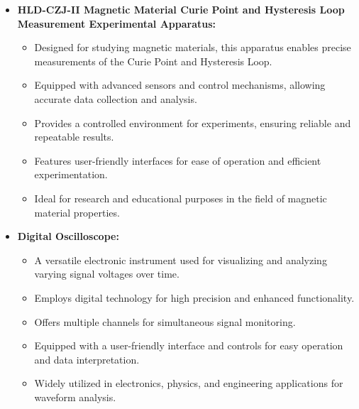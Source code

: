 \documentclass[UTF8]{article}
\begin{document}
    \begin{itemize}
        \item \textbf{HLD-CZJ-II Magnetic Material Curie Point and Hysteresis Loop Measurement Experimental Apparatus:}
            \begin{itemize}
                \item Designed for studying magnetic materials, this apparatus enables precise measurements of the Curie Point and Hysteresis Loop.
                \item Equipped with advanced sensors and control mechanisms, allowing accurate data collection and analysis.
                \item Provides a controlled environment for experiments, ensuring reliable and repeatable results.
                \item Features user-friendly interfaces for ease of operation and efficient experimentation.
                \item Ideal for research and educational purposes in the field of magnetic material properties.
            \end{itemize}
            
        \item \textbf{Digital Oscilloscope:}
            \begin{itemize}
                \item A versatile electronic instrument used for visualizing and analyzing varying signal voltages over time.
                \item Employs digital technology for high precision and enhanced functionality.
                \item Offers multiple channels for simultaneous signal monitoring.
                \item Equipped with a user-friendly interface and controls for easy operation and data interpretation.
                \item Widely utilized in electronics, physics, and engineering applications for waveform analysis.
            \end{itemize}
    \end{itemize}
    
\end{document}
